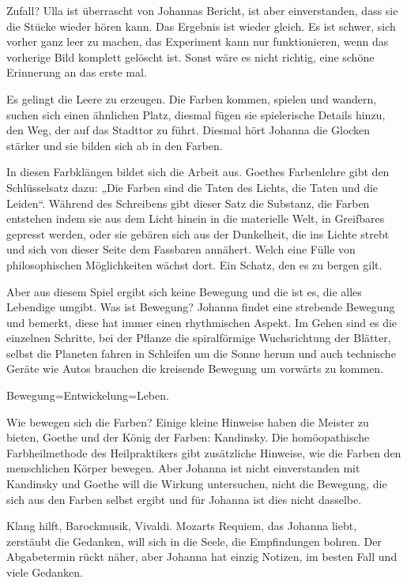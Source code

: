 \documentclass[10pt,a5paper]{book}
\begin{document}
Zufall? Ulla ist überrascht von Johannas Bericht, ist aber einverstanden, dass sie die Stücke wieder hören kann. Das Ergebnis ist wieder gleich. Es ist schwer, sich vorher ganz leer zu machen, das Experiment kann nur funktionieren, wenn das vorherige Bild komplett gelöscht ist. Sonst wäre es nicht richtig, eine schöne Erinnerung an das erste mal.

Es gelingt die Leere zu erzeugen. Die Farben kommen, spielen und wandern, suchen sich einen ähnlichen Platz, diesmal fügen sie spielerische Details hinzu, den Weg, der auf das Stadttor zu führt. Diesmal hört Johanna die Glocken stärker und sie bilden sich ab in den Farben.

In diesen Farbklängen bildet sich die Arbeit aus. Goethes Farbenlehre gibt den Schlüsselsatz dazu: „Die Farben sind die Taten des Lichts, die Taten und die Leiden“. Während des Schreibens gibt dieser Satz die Substanz, die Farben entstehen indem sie aus dem Licht hinein in die materielle Welt, in Greifbares gepresst werden, oder sie gebären sich aus der Dunkelheit, die ins Lichte strebt und sich von dieser Seite dem Fassbaren annähert. Welch eine Fülle von philosophischen Möglichkeiten wächst dort. Ein Schatz, den es zu bergen gilt.

Aber aus diesem Spiel ergibt sich keine Bewegung und die ist es, die alles Lebendige umgibt. Was ist Bewegung? Johanna findet eine strebende Bewegung und bemerkt, diese hat immer einen rhythmischen Aspekt. Im Gehen sind es die einzelnen Schritte, bei der Pflanze die spiralförmige Wuchsrichtung der Blätter, selbst die Planeten fahren in Schleifen um die Sonne herum und auch technische Geräte wie Autos brauchen die kreisende Bewegung um vorwärts zu kommen.

Bewegung=Entwickelung=Leben.

Wie bewegen sich die Farben? Einige kleine Hinweise haben die Meister zu bieten, Goethe und der König der Farben: Kandinsky. Die homöopathische Farbheilmethode des Heilpraktikers gibt zusätzliche Hinweise, wie die Farben den menschlichen Körper bewegen. Aber Johanna ist nicht einverstanden mit Kandinsky und Goethe will die Wirkung untersuchen, nicht die Bewegung, die sich aus den Farben selbst ergibt und für Johanna ist dies nicht dasselbe. 

Klang hilft, Barockmusik, Vivaldi. Mozarts Requiem, das Johanna liebt, zerstäubt die Gedanken, will sich in die Seele, die Empfindungen bohren. 
Der Abgabetermin rückt näher, aber Johanna hat einzig Notizen, im besten Fall und viele Gedanken.
\end{document}
